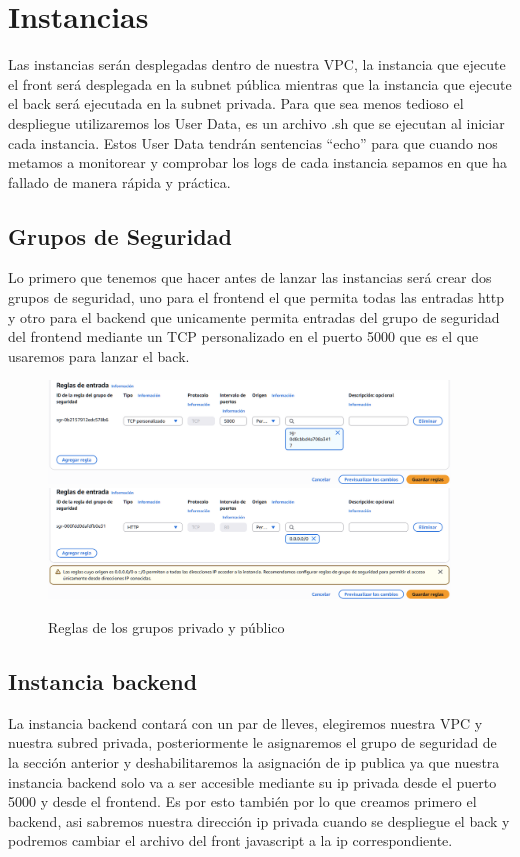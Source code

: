 \documentclass{article}
\begin{document}
	\section{Instancias}
	Las instancias serán desplegadas dentro de nuestra VPC, la instancia que ejecute el front será desplegada en la subnet pública mientras que la instancia que ejecute el back será ejecutada en la subnet privada. Para que sea menos tedioso el despliegue utilizaremos los User Data, es un archivo .sh que se ejecutan al iniciar cada instancia. Estos User Data tendrán sentencias ``echo'' para que cuando nos metamos a monitorear y comprobar los logs de cada instancia sepamos en que ha fallado de manera rápida y práctica.

	\subsection{Grupos de Seguridad}
	Lo primero que tenemos que hacer antes de lanzar las instancias será crear dos grupos de seguridad, uno para el frontend el que permita  todas las entradas http y otro para el backend que unicamente permita entradas del grupo de seguridad del frontend mediante un TCP personalizado en el puerto 5000 que es el que usaremos para lanzar el back.

		
	\begin{figure}[H]
	\centering
	\includegraphics[width=0.95\textwidth]{reglas_gr_privado.png}
	\includegraphics[width=0.95\textwidth]{reglas_gr_publico.png}
	\caption{Reglas de los grupos privado y público}
	\end{figure}

	\subsection{Instancia backend}
	La instancia backend contará con un par de lleves, elegiremos nuestra VPC y nuestra subred privada, posteriormente le asignaremos el grupo de seguridad de la sección anterior y deshabilitaremos la asignación de ip publica ya que nuestra instancia backend solo va a ser accesible mediante su ip privada desde el puerto 5000 y desde el frontend. Es por esto también por lo que creamos primero el backend, asi sabremos nuestra dirección ip privada cuando se despliegue el back y podremos cambiar el archivo del front javascript a la ip correspondiente.
\end{document}
